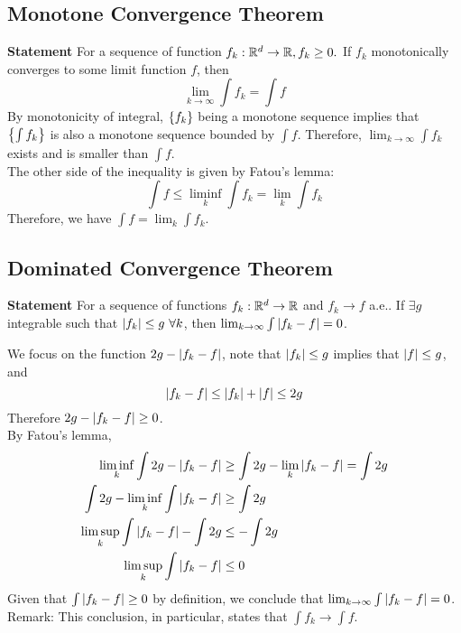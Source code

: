\subsection{Monotone Convergence Theorem}
\begin{prf}

\textbf{Statement} For a sequence of function $f_k: {\mathbb{R}}^d \to {\mathbb{R}}, f_k\geq 0.$ If $f_k$ monotonically converges to some limit function $f$, then 
$$\lim_{k\to\infty}\int f_k = \int f$$
By monotonicity of integral, $\qty{f_k}$ being a monotone sequence implies that $\qty{\int f_k}$ is also a monotone sequence bounded by $\int f$. Therefore, $\lim_{k\to\infty} \int f_k$ exists and is smaller than $\int f$. \\

The other side of the inequality is given by Fatou's lemma: 
$$\int f \leq \liminf_k \int f_k = \lim_k \int f_k$$
Therefore, we have $\int f = \lim_k \int f_k$. 

\end{prf}
\subsection{Dominated Convergence Theorem}
\textbf{Statement} For a sequence of functions $f_k: {\mathbb{R}}^d \to {\mathbb{R}}$ and $f_k\to f$ a.e.. If $\exists g$ integrable such that $\abs{f_k}\leq g \ \forall k$, then $\lim_{k\to\infty} \int \abs{f_k-f} = 0$. \\

\begin{prf}
We focus on the function $2g-\abs{f_k-f}$, note that $\abs{f_k}\leq g$ implies that $\abs{f}\leq g$, and 
$$\abs{f_k - f}\leq \abs{f_k} + \abs{f} \leq 2g$$
Therefore $2g-\abs{f_k-f}\geq 0$. \\

By Fatou's lemma,
\begin{align*}
	\liminf_{k} \int 2g - \abs{f_k-f} &\geq \int 2g - \lim_k \abs{f_k-f} = \int 2g\\
	\int 2g - \liminf_{k}\int \abs{f_k-f} &\geq \int 2g\\
	\limsup_k \int \abs{f_k-f} - \int 2g &\leq -\int 2g\\
	\limsup_k \int \abs{f_k-f}&\leq 0
\end{align*}
Given that $\int \abs{f_k-f}\geq 0$ by definition, we conclude that $\lim_{k\to\infty}\int \abs{f_k-f}= 0$.\\

Remark: This conclusion, in particular, states that $\int f_k\to \int f$.  

\end{prf}
